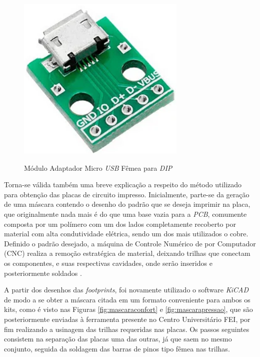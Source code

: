 \documentclass[acronym,symbols,table]{fei}
\begin{document}
\begin{figure}[!htb]
\centering
    \caption{Módulo Adaptador Micro \textit{USB} Fêmea para \textit{DIP}}
    \includegraphics[width=0.25\linewidth]{Imagens/Micro_USB.png}
    \label{fig:micro_usb}
\end{figure}

Torna-se válida também uma breve explicação a respeito do método utilizado para obtenção das placas de circuito impresso. Inicialmente, parte-se da geração de uma máscara contendo o desenho do padrão que se deseja imprimir na placa, que originalmente nada mais é do que uma base vazia para a \textit{PCB}, comumente composta por um polímero com um dos lados completamente recoberto por material com alta condutividade elétrica, sendo um dos mais utilizados o cobre. Definido o padrão desejado, a máquina de Controle Numérico de por Computador (CNC) realiza a remoção estratégica de material, deixando trilhas que conectam os componentes, e suas respectivas cavidades, onde serão inseridos e posteriormente soldados \cite{sousaPCB}.  

A partir dos desenhos das \textit {footprints}, foi novamente utilizado o software \textit{KiCAD} de modo a se obter a máscara citada em um formato conveniente para ambos os kits, como é visto nas Figuras \ref{fig:mascaraconfort} e \ref{fig:mascarapressao}, que são posteriormente enviadas à ferramenta presente no Centro Universitário FEI, por fim realizando a usinagem das trilhas requeridas nas placas. Os passos seguintes consistem na separação das placas uma das outras, já que saem no mesmo conjunto, seguida da soldagem das barras de pinos tipo fêmea nas trilhas.
\end{document}
